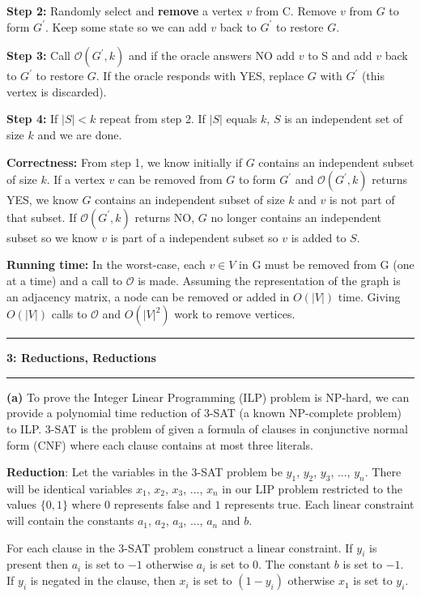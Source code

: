 \documentclass[11pt]{article}
\newcommand\question[2]{\vspace{.25in}\hrule\textbf{#1: #2}\vspace{.5em}\hrule\vspace{.10in}}
\renewcommand\part[1]{\vspace{.10in}\textbf{(#1)}}
\newcommand\correctness{\vspace{.10in}\textbf{Correctness: }}
\newcommand\runtime{\vspace{.10in}\textbf{Running time: }}
\begin{document}
\textbf{Step 2:} Randomly select and \textbf{remove} a vertex $v$ from C. Remove $v$ from $G$ to form $G^\prime$. Keep some state so we can add $v$ back to $G^\prime$ to restore $G$.

\textbf{Step 3:} Call $\mathcal{O}(G^\prime, k)$ and if the oracle answers NO add $v$ to S and add $v$ back to $G^\prime$ to restore $G$. If the oracle responds with YES, replace $G$ with $G^\prime$ (this vertex is discarded).

\textbf{Step 4:} If $|S| < k$ repeat from step 2. If $|S|$ equals $k$, $S$ is an independent set of size $k$ and we are done.

\correctness From step 1, we know initially if $G$ contains an independent subset of size $k$. If a vertex $v$ can be removed from $G$ to form $G^\prime$ and $\mathcal{O}(G^\prime, k)$ returns YES, we know $G$ contains an independent subset of size $k$ and $v$ is not part of that subset. If $\mathcal{O}(G^\prime, k)$ returns NO, $G$ no longer contains an independent subset so we know $v$ is part of a independent subset so $v$ is added to $S$.

\runtime In the worst-case, each $v \in V$ in G must be removed from G (one at a time) and a call to $\mathcal{O}$ is made. Assuming the representation of the graph is an adjacency matrix, a node can be removed or added in $O(|V|)$ time. Giving $O(|V|)$ calls to $\mathcal{O}$ and $O(|V|^2)$ work to remove vertices.

\question{3}{Reductions, Reductions}

\part{a} To prove the Integer Linear Programming (ILP) problem is NP-hard, we can provide a polynomial time reduction of 3-SAT (a known NP-complete problem) to ILP. 3-SAT is the problem of given a formula of clauses in conjunctive normal form (CNF) where each clause contains at most three literals.

\textbf{Reduction}: Let the variables in the 3-SAT problem be $y_1$, $y_2$, $y_3$, ..., $y_n$. There will be identical variables $x_1$, $x_2$, $x_3$, ..., $x_n$ in our LIP problem restricted to the values $\{0, 1\}$ where $0$ represents false and $1$ represents true. Each linear constraint will contain the constants $a_1$, $a_2$, $a_3$, ..., $a_n$ and $b$.

	For each clause in the 3-SAT problem construct a linear constraint. If $y_i$ is present then $a_i$ is set to $-1$ otherwise $a_i$ is set to $0$. The constant $b$ is set to $-1$. If $y_i$ is negated in the clause, then $x_i$ is set to $(1 - y_i)$ otherwise $x_1$ is set to $y_i$.
	
\end{document}
